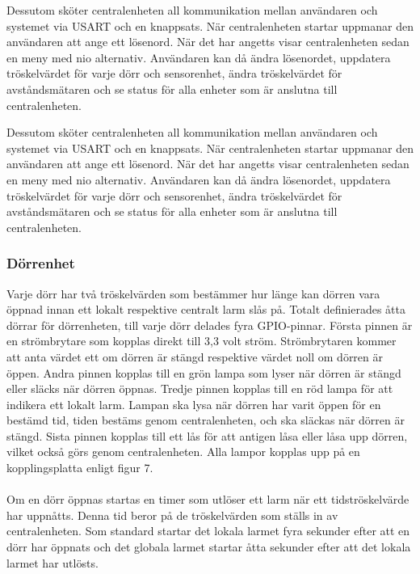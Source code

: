 \documentclass{article}
\begin{document}
Dessutom sköter centralenheten all kommunikation mellan användaren och systemet via USART och en knappsats. När centralenheten startar uppmanar den användaren att ange ett lösenord. När det har angetts visar centralenheten sedan en meny med nio alternativ. Användaren kan då ändra lösenordet, uppdatera tröskelvärdet för varje dörr och sensorenhet, ändra tröskelvärdet för avståndsmätaren och se status för alla enheter som är anslutna till centralenheten.

\noindent Dessutom sköter centralenheten all kommunikation mellan användaren och systemet via USART och en knappsats. När centralenheten startar uppmanar den användaren att ange ett lösenord. När det har angetts visar centralenheten sedan en meny med nio alternativ. Användaren kan då ändra lösenordet, uppdatera tröskelvärdet för varje dörr och sensorenhet, ändra tröskelvärdet för avståndsmätaren och se status för alla enheter som är anslutna till centralenheten.

\subsubsection{Dörrenhet}
Varje dörr har två tröskelvärden som bestämmer hur länge kan dörren vara öppnad innan ett lokalt respektive centralt larm slås på. Totalt definierades åtta dörrar för dörrenheten, till varje dörr delades fyra GPIO-pinnar. Första pinnen är en strömbrytare som kopplas direkt till 3,3 volt ström. Strömbrytaren kommer att anta värdet ett om dörren är stängd respektive värdet noll om dörren är öppen. Andra pinnen kopplas till en grön lampa som lyser när dörren är stängd eller släcks när dörren öppnas. Tredje pinnen kopplas till en röd lampa för att indikera ett lokalt larm. Lampan ska lysa när dörren har varit öppen för en bestämd tid, tiden bestäms genom centralenheten, och ska släckas när dörren är stängd. Sista pinnen kopplas till ett lås för att antigen låsa eller låsa upp dörren, vilket också görs genom centralenheten. Alla lampor kopplas upp på en kopplingsplatta enligt figur 7.
\\
\\Om en dörr öppnas startas en timer som utlöser ett larm när ett tidströskelvärde har uppnåtts. Denna tid beror på de tröskelvärden som ställs in av centralenheten. Som standard startar det lokala larmet fyra sekunder efter att en dörr har öppnats och det globala larmet startar åtta sekunder efter att det lokala larmet har utlösts. 
\end{document}
